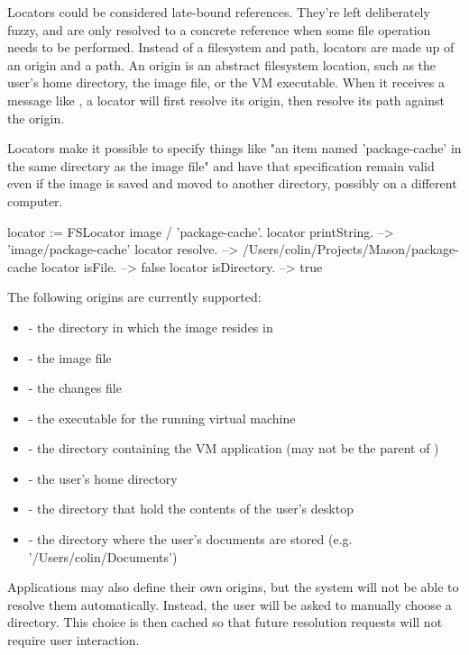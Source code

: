 \documentclass[a4paper,10pt,twoside]{book}
\begin{document}
Locators could be considered late-bound references. They're left deliberately fuzzy, and are only resolved to a concrete reference when some file operation needs to be performed. Instead of a filesystem and path, locators are made up of an origin and a path. An origin is an abstract filesystem location, such as the user's home directory, the image file, or the VM executable. When it receives a message like , a locator will first resolve its origin, then resolve its path against the origin.

Locators make it possible to specify things like "an item named 'package-cache' in the same directory as the image file" and have that specification remain valid even if the image is saved and moved to another directory, possibly on a different computer.

\begin{code}{}
    locator := FSLocator image / 'package-cache'.
    locator printString.             --> '{image}/package-cache'
    locator resolve.                 --> /Users/colin/Projects/Mason/package-cache
    locator isFile.                  --> false
    locator isDirectory.             --> true
\end{code}	

The following origins are currently supported:

\begin{itemize}
\item {} - the directory in which the image resides in
\item{} - the image file
\item{} - the changes file
\item{} - the executable for the running virtual machine
\item{} - the directory containing the VM application (may not be the parent of )
\item{} - the user's home directory
\item{} - the directory that hold the contents of the user's desktop
\item{} - the directory where the user's documents are stored (e.g. '/Users/colin/Documents')
\end{itemize}

Applications may also define their own origins, but the system will not be able to resolve them automatically. Instead, the user will be asked to manually choose a directory. This choice is then cached so that future resolution requests will not require user interaction.
\end{document}
